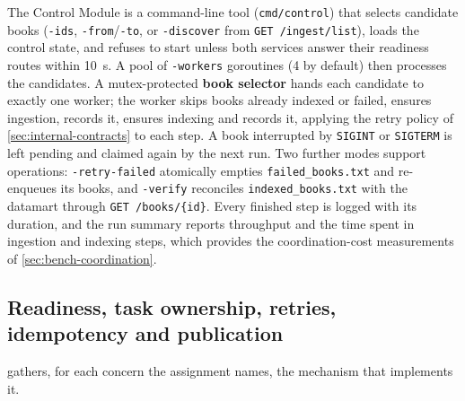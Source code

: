 \documentclass[10pt,a4paper]{article}
\newcommand{\code}[1]{\texttt{#1}}
\newcommand{\route}[1]{\texttt{#1}}
\begin{document}
The Control Module is a command-line tool (\code{cmd/control}) that selects
candidate books (\code{-ids}, \code{-from}/\code{-to}, or \code{-discover}
from \route{GET /ingest/list}), loads the control state, and refuses to start
unless both services answer their readiness routes within 10~s. A pool of
\code{-workers} goroutines (4 by default) then processes the candidates. A
mutex-protected \textbf{book selector} hands each candidate to exactly one
worker; the worker skips books already indexed or failed, ensures ingestion,
records it, ensures indexing and records it, applying the retry policy of
\cref{sec:internal-contracts} to each step. A book interrupted by
\code{SIGINT} or \code{SIGTERM} is left pending and claimed again by the next
run. Two further modes support operations:
\code{-retry-failed} atomically empties \code{failed\_books.txt} and
re-enqueues its books, and \code{-verify} reconciles \code{indexed\_books.txt}
with the datamart through \route{GET /books/\{id\}}. Every finished step is
logged with its duration, and the run summary reports throughput and the time
spent in ingestion and indexing steps, which provides the coordination-cost
measurements of \cref{sec:bench-coordination}.

\subsection{Readiness, task ownership, retries, idempotency and publication}
\label{sec:readiness}

 gathers, for each concern the assignment names, the
mechanism that implements it.
\end{document}
